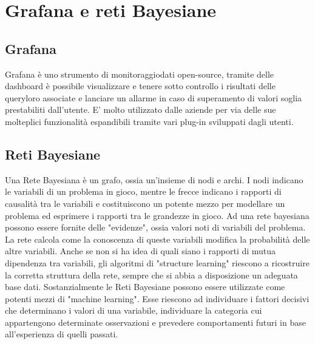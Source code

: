 \section{Grafana e reti Bayesiane}
		\subsection{Grafana}			
Grafana è uno strumento di monitoraggio\pedice dati open-source, tramite delle dashboard è possibile visualizzare e tenere sotto controllo i risultati delle query\pedice loro associate e lanciare un allarme in caso di superamento di valori soglia prestabiliti dall'utente. E' molto utilizzato dalle aziende per via delle sue molteplici funzionalità  espandibili tramite vari plug-in sviluppati dagli utenti.


		\subsection{Reti Bayesiane}
Una Rete Bayesiana è un grafo, ossia un'insieme di nodi e archi. I nodi
indicano le variabili di un problema in gioco, mentre le frecce indicano i
rapporti di causalità tra le variabili e costituiscono un potente mezzo per
modellare un problema ed esprimere i rapporti tra le grandezze in gioco.
Ad una rete bayesiana possono essere fornite delle "evidenze", ossia valori noti di variabili del problema. 
La rete calcola come la conoscenza di queste variabili modifica la probabilità  delle altre variabili.
Anche se non si ha idea di quali siano i rapporti di mutua dipendenza tra
variabili, gli algoritmi di "structure learning" riescono a ricostruire la corretta struttura della rete, sempre che si abbia a disposizione un adeguata base dati.
Sostanzialmente le Reti Bayesiane possono essere utilizzate come potenti mezzi
di "machine learning\pedice". Esse riescono ad individuare i fattori decisivi che
determinano i valori di una variabile, individuare la categoria cui appartengono determinate osservazioni e prevedere comportamenti futuri in base all'esperienza di quelli passati.


\newpage
